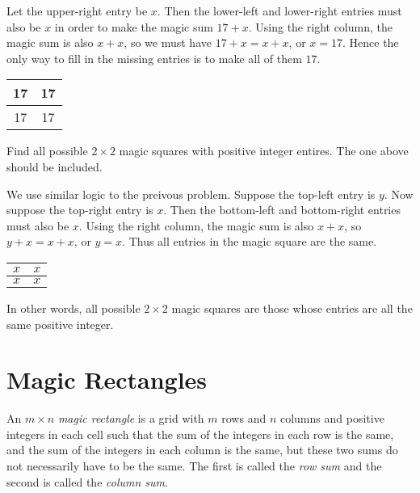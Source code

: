 \documentclass[11pt]{article}
\renewenvironment{problem}{\begin{problems}}{\end{problems}\vspace{5pt}}
\begin{document}
\begin{solution}
Let the upper-right entry be $x$. Then the lower-left and lower-right entries must also be $x$ in order
to make the magic sum $17+x$. Using the right column, the magic sum is also $x+x$, so we must have
$17+x = x+x$, or $x = 17$. Hence the only way to fill in the missing entries is to make all of them $17$.

\begin{center}
\begin{tabular}{|c|c|}
\hline
17 & 17 \\ \hline
17 & 17 \\ \hline
\end{tabular}
\end{center}
\end{solution}

\begin{problem}[4 points]
Find all possible $2 \times 2$ magic squares with positive integer entires. The one above should be included.
\end{problem}

\begin{solution}
We use similar logic to the preivous problem. Suppose the top-left entry is $y$. 
Now suppose the top-right entry is $x$. Then the bottom-left and bottom-right entries must also be $x$.
Using the right column, the magic sum is also $x+x$, so $y+x = x+x$, or $y = x$.
Thus all entries in the magic square are the same.

\begin{center}
\begin{tabular}{|c|c|}
\hline
$x$ & $x$ \\ \hline
$x$ & $x$ \\ \hline
\end{tabular}
\end{center}

In other words, all possible $2 \times 2$ magic squares are those whose entries are all the same positive integer.
\end{solution}

\section{Magic Rectangles}

\begin{definition}
An $m \times n$ \textit{magic rectangle} is a grid with $m$ rows and $n$ columns and positive integers in each cell such that
the sum of the integers in each row is the same, and the sum of the integers in each column is the same,
but these two sums do not necessarily have to be the same.
The first is called the \textit{row sum} and the second is called the \textit{column sum}.
\end{definition}
\end{document}
